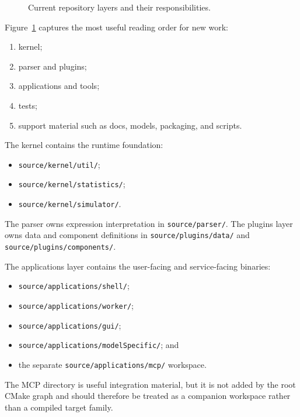 \begin{figure}[htbp]
\centering
\caption{Current repository layers and their responsibilities.}
\label{fig:repo-layer-map}
\end{figure}

Figure~\ref{fig:repo-layer-map} captures the most useful reading order for new
work:
\begin{enumerate}
\item kernel;
\item parser and plugins;
\item applications and tools;
\item tests;
\item support material such as docs, models, packaging, and scripts.
\end{enumerate}

The kernel contains the runtime foundation:
\begin{itemize}
\item \texttt{source/kernel/util/};
\item \texttt{source/kernel/statistics/};
\item \texttt{source/kernel/simulator/}.
\end{itemize}
The parser owns expression interpretation in \texttt{source/parser/}. The
plugins layer owns data and component definitions in
\texttt{source/plugins/data/} and \texttt{source/plugins/components/}.

The applications layer contains the user-facing and service-facing binaries:
\begin{itemize}
\item \texttt{source/applications/shell/};
\item \texttt{source/applications/worker/};
\item \texttt{source/applications/gui/};
\item \texttt{source/applications/modelSpecific/}; and
\item the separate \texttt{source/applications/mcp/} workspace.
\end{itemize}
The MCP directory is useful integration material, but it is not added by the
root CMake graph and should therefore be treated as a companion workspace
rather than a compiled target family.

